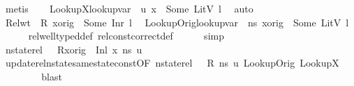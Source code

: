 \begin{isabellebody}
\ metis\isanewline
\ \ \isamarkupfalse%
\ LookupX{}{\isacharcolon}{\kern0pt}{\isachardoublequoteopen}lookup{\isacharunderscore}{\kern0pt}var\ {\isasymLambda}{\isacharprime}{\kern0pt}\ u{\isacharprime}{\kern0pt}\ x{}\ {\isacharequal}{\kern0pt}\ Some\ {\isacharparenleft}{\kern0pt}LitV\ l{\isacharparenright}{\kern0pt}{\isachardoublequoteclose}\ \isamarkupfalse%
\ auto\isanewline
\ \ \isamarkupfalse%
\ Rel{\isacharunderscore}{\kern0pt}wt\ \ {\isacartoucheopen}R\ x{\isacharunderscore}{\kern0pt}orig\ {\isacharequal}{\kern0pt}\ Some\ {\isacharparenleft}{\kern0pt}Inr\ l{\isacharparenright}{\kern0pt}{\isacartoucheclose}\ \isamarkupfalse%
\ LookupOrig{\isacharcolon}{\kern0pt}{\isachardoublequoteopen}lookup{\isacharunderscore}{\kern0pt}var\ {\isasymLambda}\ ns\ x{\isacharunderscore}{\kern0pt}orig\ {\isacharequal}{\kern0pt}\ Some\ {\isacharparenleft}{\kern0pt}LitV\ l{\isacharparenright}{\kern0pt}{\isachardoublequoteclose}\isanewline
\ \ \ \ \isamarkupfalse%
\ rel{\isacharunderscore}{\kern0pt}well{\isacharunderscore}{\kern0pt}typed{\isacharunderscore}{\kern0pt}def\ rel{\isacharunderscore}{\kern0pt}const{\isacharunderscore}{\kern0pt}correct{\isacharunderscore}{\kern0pt}def\isanewline
\ \ \ \ \isamarkupfalse%
\ simp\isanewline
\ \ \isamarkupfalse%
\ {\isachardoublequoteopen}nstate{\isacharunderscore}{\kern0pt}rel\ {\isasymLambda}\ {\isasymLambda}{\isacharprime}{\kern0pt}\ {\isacharparenleft}{\kern0pt}R{\isacharparenleft}{\kern0pt}x{\isacharunderscore}{\kern0pt}orig\ {\isasymmapsto}\ {\isacharparenleft}{\kern0pt}Inl\ x{}{\isacharparenright}{\kern0pt}{\isacharparenright}{\kern0pt}{\isacharparenright}{\kern0pt}\ ns\ u{\isacharprime}{\kern0pt}{\isachardoublequoteclose}\isanewline
\ \ \ \ \isamarkupfalse%
\ update{\isacharunderscore}{\kern0pt}rel{\isacharunderscore}{\kern0pt}nstate{\isacharunderscore}{\kern0pt}same{\isacharunderscore}{\kern0pt}state{\isacharunderscore}{\kern0pt}const{\isacharbrackleft}{\kern0pt}OF\ {\isacartoucheopen}nstate{\isacharunderscore}{\kern0pt}rel\ {\isasymLambda}\ {\isasymLambda}{\isacharprime}{\kern0pt}\ R\ ns\ u{\isacharprime}{\kern0pt}{\isacartoucheclose}{\isacharbrackright}{\kern0pt}\ LookupOrig\ LookupX{}\ \ \ \ \isanewline
\ \ \ \ \isamarkupfalse%
\ blast\ \ \ \ \isanewline
{}\isamarkupfalse%
%
\endisatagproof
{\isafoldproof}%
%
\isadelimproof
\isanewline
%
\endisadelimproof
\isanewline

\end{isabellebody}
